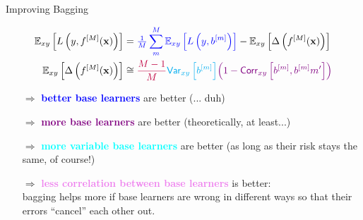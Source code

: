 \documentclass[11pt,compress,t,notes=noshow, xcolor=table]{beamer}
\begin{document}
\begin{vbframe}{Improving Bagging}
\begin{small}
\begin{align*}
\mathbb{E}_{xy}\left[L\left(y, f^{[M]}(\mathbf{x})\right)\right] &= \textcolor{blue}{\tfrac{1}{M}\sum^M_{m} \mathbb{E}_{xy}\left[L\left(y, b^{[m]} \right)\right]} - \mathbb{E}_{xy}\left[\Delta\left(f^{[M]}(\mathbf{x})\right)\right]\\
\mathbb{E}_{xy}\left[\Delta\left(f^{[M]}(\mathbf{x})\right)\right] &\cong 
\textcolor{purple}{\frac{M-1}{M}} \textcolor{cyan}{\mathsf{Var}_{xy}\left[b^{[m]}\right]} \textcolor{violet}{\left(1 - \mathsf{Corr}_{xy}\left[b^{[m]}, b^{[m]}{m'}\right]\right)}
\end{align*}
\end{small}
\begin{itemize}
\item[$\Rightarrow$] \textcolor{blue}{\textbf{better base learners}} are better {\small (... duh)}
\item[$\Rightarrow$] \textcolor{purple}{\textbf{more base learners}} are better {\small (theoretically, at least...)}\\
\item[$\Rightarrow$] \textcolor{cyan}{\textbf{more variable base learners}} are better {\small(as long as their risk stays the same, of course!)}
\item[$\Rightarrow$] \textcolor{violet}{\textbf{less correlation between base learners}} is better:\\ bagging helps more if base learners are wrong in different ways so that their errors \enquote{cancel} each other out.\\
\end{itemize}


\end{vbframe}


\endlecture
\end{document}
